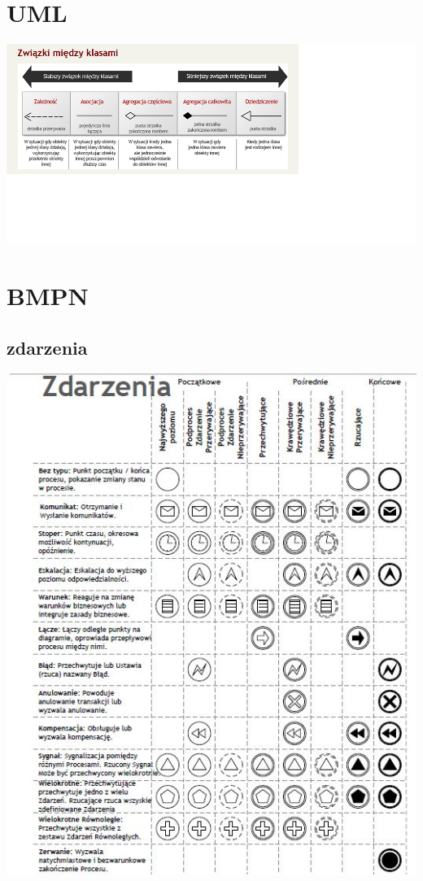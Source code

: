 \documentclass[11pt]{article}
\author{Patryk Kaniewski}
\date{\today}
\title{}
\begin{document}
\tableofcontents \clearpage
\section{UML}
\label{sec:orga455261}
\begin{center}
\includegraphics[width=.9\linewidth]{./zwiazki_UML.png}
\end{center}

\section{BMPN}
\label{sec:org31f64b7}
\subsection{zdarzenia}
\label{sec:orgf6b16a0}
\begin{center}
\includegraphics[width=.9\linewidth]{./zdarzenia.png}
\end{center}
\end{document}
